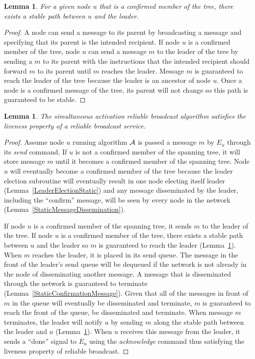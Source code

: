 \documentclass[english]{article}
\newtheorem{lemma}[theorem]{Lemma}
\begin{document}
\begin{lemma}
\label{StaticStablePath}
For a given node $u$ that is a confirmed member of the tree, there exists a stable path between $u$ and the leader.
\end{lemma}
\begin{proof}

A node can send a message to its parent by broadcasting a message and specifying that its parent is the intended recipient. If node $u$ is a confirmed member of the tree, node $u$ can send a message $m$ to the leader of the tree by sending a $m$ to its parent with the instructions that the intended recipient should forward $m$ to its parent until $m$ reaches the leader. Message $m$ is guaranteed to reach the leader of the tree because the leader is an ancestor of node $u$. Once a node is a confirmed message of the tree, its parent will not change so this path is guaranteed to be stable.

\end{proof}


\begin{lemma}
\label{StaticRBLiveness}
The simultaneous activation reliable broadcast algorithm satisfies the liveness property of a reliable broadcast service.
\end{lemma}
\begin{proof}

Assume node $u$ running algorithm $\cal A$ is passed a message $m$ by $E_u$ through its \textit{send} command. If $u$ is not a confirmed member of the spanning tree, it will store message $m$ until it becomes a confirmed member of the spanning tree. Node $u$ will eventually become a confirmed member of the tree because the leader election subroutine will eventually result in one node electing itself leader (Lemma~\ref{LeaderElectionStatic}) and any message disseminated by the leader, including the ``confirm'' message, will be seen by every node in the network (Lemma~\ref{StaticMessageDissemination}).

If node $u$ is a confirmed member of the spanning tree, it sends $m$ to the leader of the tree. If node $u$ is a confirmed member of the tree, there exists a stable path between $u$ and the leader so $m$ is guaranteed to reach the leader (Lemma~\ref{StaticStablePath}). When $m$ reaches the leader, it is placed in its send queue. The message in the front of the leader's send queue will be dequeued if the network is not already in the node of disseminating another message. A message that is disseminated through the network is guaranteed to terminate (Lemma~\ref{StaticConfirmationMessage}). Given that all of the messages in front of $m$ in the queue will eventually be disseminated and terminate, $m$ is guaranteed to reach the front of the queue, be disseminated and terminate. When message $m$ terminates, the leader will notify $u$ by sending $m$ along the stable path between the leader and $u$ (Lemma~\ref{StaticStablePath}). When $u$ receives this message from the leader, it sends  a ``done'' signal to $E_u$ using the \textit{acknowledge} command thus satisfying the liveness property of reliable broadcast.

\end{proof}
\end{document}
